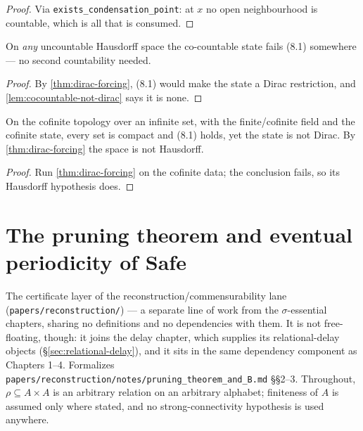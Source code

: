 \begin{proof}
  \leanok
  Via \texttt{exists\_condensation\_point}: at $x$ no open neighbourhood is
  countable, which is all that is consumed.
\end{proof}

\begin{corollary}
  \label{cor:cocountable-fails-hausdorff}
  \leanok
  On \emph{any} uncountable Hausdorff space the co-countable state fails (8.1)
  somewhere --- no second countability needed.
\end{corollary}

\begin{proof}
  \leanok
  By \ref{thm:dirac-forcing}, (8.1) would make the state a Dirac restriction,
  and \ref{lem:cocountable-not-dirac} says it is none.
\end{proof}

\begin{proposition}
  \label{prop:cofinite-red-flag}
  \leanok
  On the cofinite topology over an infinite set, with the finite/cofinite field
  and the cofinite state, every set is compact and (8.1) holds, yet the state is
  not Dirac. By \ref{thm:dirac-forcing} the space is not Hausdorff.
\end{proposition}

\begin{proof}
  \leanok
  Run \ref{thm:dirac-forcing} on the cofinite data; the conclusion fails, so its
  Hausdorff hypothesis does.
\end{proof}
\chapter{The pruning theorem and eventual periodicity of Safe}

The certificate layer of the reconstruction/commensurability lane
(\texttt{papers/reconstruction/}) --- a separate line of work from the
$\sigma$-essential chapters, sharing no definitions and no dependencies with
them. It is not free-floating, though: it joins the delay chapter, which
supplies its relational-delay objects (\S\ref{sec:relational-delay}), and it
sits in the same dependency component as Chapters 1--4. Formalizes \texttt{papers/reconstruction/notes/pruning\_theorem\_and\_B.md}
\S\S2--3. Throughout, $\rho \subseteq A \times A$ is an arbitrary relation on an
arbitrary alphabet; finiteness of $A$ is assumed only where stated, and no
strong-connectivity hypothesis is used anywhere.

